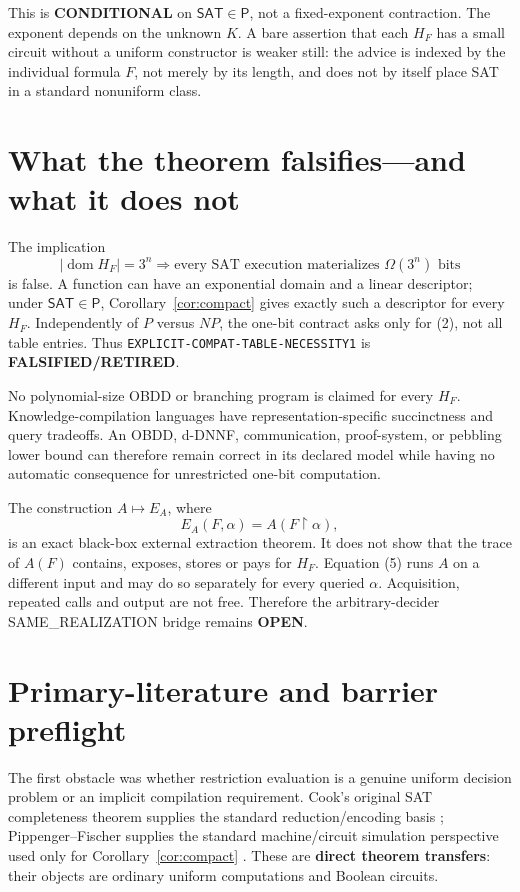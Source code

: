 \documentclass[11pt]{article}
\newcommand{\SAT}{\mathsf{SAT}}
\newcommand{\COND}{\textbf{CONDITIONAL}}
\newcommand{\OPEN}{\textbf{OPEN}}
\newcommand{\RETIRED}{\textbf{FALSIFIED/RETIRED}}
\begin{document}
This is \COND{} on $\SAT\in\mathsf P$, not a fixed-exponent contraction.
The exponent depends on the unknown $K$.  A bare assertion that each $H_F$
has a small circuit without a uniform constructor is weaker still: the advice
is indexed by the individual formula $F$, not merely by its length, and does
not by itself place SAT in a standard nonuniform class.

\section{What the theorem falsifies---and what it does not}

The implication
\[
 |\operatorname{dom}H_F|=3^n
 \Longrightarrow
 \text{every SAT execution materializes }\Omega(3^n)\text{ bits}           \tag{4}
\]
is false.  A function can have an exponential domain and a linear descriptor;
under $\SAT\in\mathsf P$, Corollary~\ref{cor:compact} gives exactly such a
descriptor for every $H_F$.  Independently of $P$ versus $NP$, the one-bit
contract asks only for (2), not all table entries.  Thus
\texttt{EXPLICIT-COMPAT-TABLE-NECESSITY1} is \RETIRED.

No polynomial-size OBDD or branching program is claimed for every $H_F$.
Knowledge-compilation languages have representation-specific succinctness
and query tradeoffs.  An OBDD, d-DNNF, communication, proof-system, or
pebbling lower bound can therefore remain correct in its declared model while
having no automatic consequence for unrestricted one-bit computation.

The construction $A\mapsto E_A$, where
\[
 E_A(F,\alpha)=A(F\upharpoonright\alpha),                 \tag{5}
\]
is an exact black-box external extraction theorem.  It does not show that the
trace of $A(F)$ contains, exposes, stores or pays for $H_F$.  Equation (5)
runs $A$ on a different input and may do so separately for every queried
$\alpha$.  Acquisition, repeated calls and output are not free.  Therefore
the arbitrary-decider SAME\_REALIZATION bridge remains \OPEN.

\section{Primary-literature and barrier preflight}

The first obstacle was whether restriction evaluation is a genuine uniform
decision problem or an implicit compilation requirement.  Cook's original
SAT completeness theorem supplies the standard reduction/encoding basis
\cite{Cook71}; Pippenger--Fischer supplies the standard machine/circuit
simulation perspective used only for Corollary~\ref{cor:compact}
\cite{PF79}.  These are \textbf{direct theorem transfers}: their objects are
ordinary uniform computations and Boolean circuits.
\end{document}
